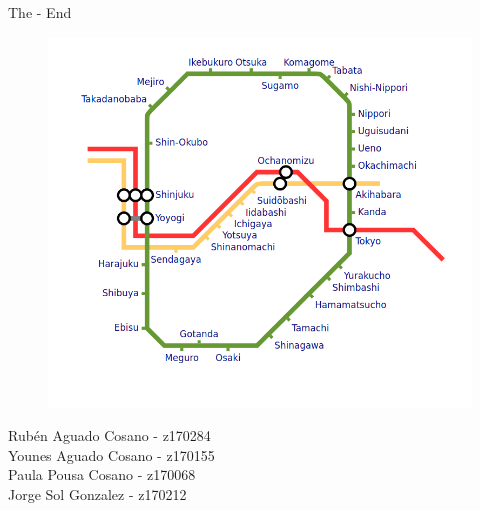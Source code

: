 \documentclass{beamer}
\begin{document}
\begin{frame}{The - End}
  \begin{figure}[H]
    \centering
    \includegraphics[scale=0.25]{"../pics/web.png"}
  \end{figure}

  \begin{center}
    {\ssmall Rubén Aguado Cosano - z170284 \\ 
      Younes Aguado Cosano - z170155 \\ 
      Paula Pousa Cosano - z170068 \\ 
      Jorge Sol Gonzalez - z170212 \\
    }
  \end{center}
\end{frame}

\end{document}
